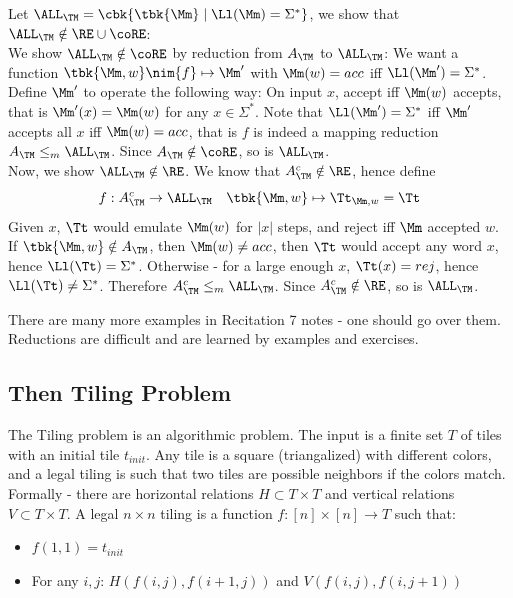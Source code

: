 \begin{example}
	Let $\ALL_\TM = \cbk{\tbk{\Mm}\mid \Ll(\Mm) = \Sigma^*}$, we show that $\ALL_\TM\notin \RE\cup \coRE$:\\
	We show $\ALL_\TM\notin \coRE$ by reduction from $A_\TM$ to $\ALL_\TM$: We want a function $\tbk{\Mm,w}\nim{f}\mapsto \Mm'$ with $\Mm(w) = acc$ iff $\Ll(\Mm') = \Sigma^*$. Define $\Mm'$ to operate the following way: On input $x$, accept iff $\Mm(w)$ accepts, that is $\Mm'(x) = \Mm(w)$ for any $x\in \Sigma^*$. Note that $\Ll(\Mm') = \Sigma^*$ iff $\Mm'$ accepts all $x$ iff $\Mm(w) = acc$, that is $f$ is indeed a mapping reduction $A_\TM\leq_m \ALL_\TM$. Since $A_\TM\notin \coRE$, so is $\ALL_\TM$.\\
	Now, we show $\ALL_\TM\notin \RE$. We know that $A_\TM^c\notin \RE$, hence define
	\[
	f:A_\TM^c\to \ALL_\TM \quad \tbk{\Mm,w}\mapsto \Tt_{\Mm,w} = \Tt
	\]
	Given $x$, $\Tt$ would emulate $\Mm(w)$ for $|x|$ steps, and reject iff $\Mm$ accepted $w$. If $\tbk{\Mm,w}\notin A_\TM$, then $\Mm(w) \neq acc$, then $\Tt$ would accept any word $x$, hence $\Ll(\Tt) = \Sigma^*$. Otherwise - for a large enough $x$, $\Tt(x) = rej$, hence $\Ll(\Tt)\neq \Sigma^*$. Therefore $A_\TM^c\leq_m \ALL_\TM$. Since $A_\TM^c\notin \RE$, so is $\ALL_\TM$.
\end{example}
\begin{mdframed}
	There are many more examples in Recitation 7 notes - one should go over them. Reductions are difficult and are learned by examples and exercises.
\end{mdframed}
\subsection*{Then Tiling Problem}
The Tiling problem is an algorithmic problem. The input is a finite set $T$ of tiles with an initial tile $t_{init}$. Any tile is a square (triangalized) with different colors, and a legal tiling is such that two tiles are possible neighbors if the colors match. Formally - there are horizontal relations $H\subset T\times T$ and vertical relations $V\subset T\times T$. A legal $n\times n$ tiling is a function $f:[n]\times [n]\to T$ such that:
\begin{itemize}
	\item $f(1,1) = t_{init}$
	\item For any $i,j$: $H\left(f(i,j), f(i+1,j)\right)$ and $V\left(f(i,j), f(i,j+1)\right)$
\end{itemize}
